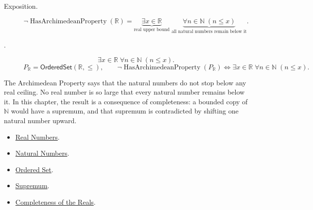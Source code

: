 \begin{remark*}
\begin{description}
  \item[Exposition.]
\[
\neg\operatorname{HasArchimedeanProperty}(\mathbb{R})
=
\underbrace{\exists x\in\mathbb{R}}_{\text{real upper bound}}
\;\underbrace{\forall n\in\mathbb{N}\;(n\le x)}_{\text{all natural numbers remain below it}}.
\]


  \item[.]
  \[
\exists x\in\mathbb{R}\;\forall n\in\mathbb{N}\;(n\le x).
\]
\[
P_{\mathbb{R}}=\mathsf{OrderedSet}(\mathbb{R},\leq),\qquad
\neg\operatorname{HasArchimedeanProperty}(P_{\mathbb{R}})\Longleftrightarrow
\exists x\in\mathbb{R}\;\forall n\in\mathbb{N}\;(n\le x).
\]
\end{description}
\end{remark*}

\begin{remark*}[Interpretation]
The Archimedean Property says that the natural numbers do not stop below any real ceiling. No real number is so large that every natural number remains below it. In this chapter, the result is a consequence of completeness: a bounded copy of $\mathbb{N}$ would have a supremum, and that supremum is contradicted by shifting one natural number upward.
\end{remark*}

\begin{dependencies}
\begin{itemize}
\item \hyperref[def:reals]{Real Numbers}.
\item \hyperref[def:natural-numbers]{Natural Numbers}.
\item \hyperref[def:ordered-set]{Ordered Set}.
\item \hyperref[def:supremum]{Supremum}.
\item \hyperref[ax:completeness-of-reals]{Completeness of the Reals}.
\end{itemize}
\end{dependencies}
















